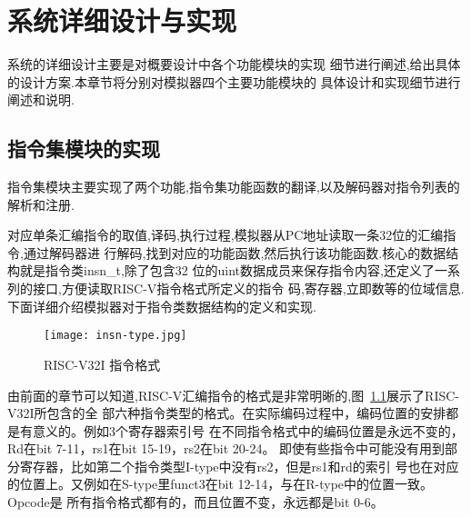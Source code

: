 
\chapter{系统详细设计与实现}

系统的详细设计主要是对概要设计中各个功能模块的实现
细节进行阐述,给出具体的设计方案.本章节将分别对模拟器四个主要功能模块的
具体设计和实现细节进行阐述和说明.

\section{指令集模块的实现}

指令集模块主要实现了两个功能,指令集功能函数的翻译,以及解码器对指令列表的解析和注册.

对应单条汇编指令的取值,译码,执行过程,模拟器从PC地址读取一条32位的汇编指令,通过解码器进
行解码,找到对应的功能函数,然后执行该功能函数.核心的数据结构就是指令类insn\_t,除了包含32
位的uint数据成员来保存指令内容,还定义了一系列的接口,方便读取RISC-V指令格式所定义的指令
码,寄存器,立即数等的位域信息.下面详细介绍模拟器对于指令类数据结构的定义和实现.
\begin{figure}[h]
    \centering
    \texttt{[image: insn-type.jpg]}
    \caption{RISC-V32I 指令格式}
    \label{fig:insn-type}
\end{figure}
由前面的章节可以知道,RISC-V汇编指令的格式是非常明晰的,图~\ref{fig:insn-type}展示了RISC-V32I所包含的全
部六种指令类型的格式。在实际编码过程中，编码位置的安排都是有意义的。例如3个寄存器索引号
在不同指令格式中的编码位置是永远不变的，Rd在bit 7-11，rs1在bit 15-19，rs2在bit 20-24。
即使有些指令中可能没有用到部分寄存器，比如第二个指令类型I-type中没有rs2，但是rs1和rd的索引
号也在对应的位置上。又例如在S-type里funct3在bit 12-14，与在R-type中的位置一致。Opcode是
所有指令格式都有的，而且位置不变，永远都是bit 0-6。


